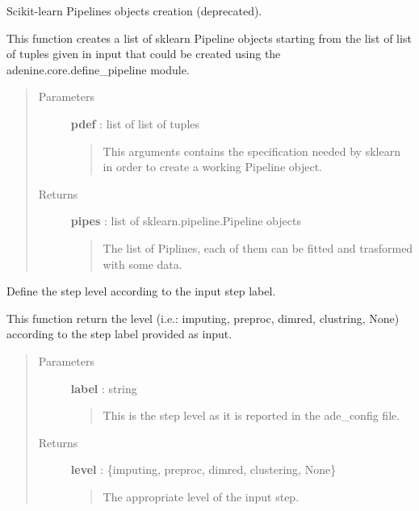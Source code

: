 \documentclass[letterpaper,10pt,english]{sphinxmanual}
\begin{document}
\begin{fulllineitems}
\label{index:adenine.core.pipelines.create}
Scikit-learn Pipelines objects creation (deprecated).

This function creates a list of sklearn Pipeline objects starting from the list of list of tuples given in input that could be created using the adenine.core.define\_pipeline module.
\begin{quote}\begin{description}
\item[{Parameters}] \leavevmode
\textbf{pdef} : list of list of tuples
\begin{quote}

This arguments contains the specification needed by sklearn in order to create a working Pipeline object.
\end{quote}

\item[{Returns}] \leavevmode
\textbf{pipes} : list of sklearn.pipeline.Pipeline objects
\begin{quote}

The list of Piplines, each of them can be fitted and trasformed with some data.
\end{quote}

\end{description}\end{quote}

\end{fulllineitems}


\begin{fulllineitems}
\label{index:adenine.core.pipelines.which_level}
Define the step level according to the input step label.

This function return the level (i.e.: imputing, preproc, dimred, clustring, None) according to the step label provided as input.
\begin{quote}\begin{description}
\item[{Parameters}] \leavevmode
\textbf{label} : string
\begin{quote}

This is the step level as it is reported in the ade\_config file.
\end{quote}

\item[{Returns}] \leavevmode
\textbf{level} : \{imputing, preproc, dimred, clustering, None\}
\begin{quote}

The appropriate level of the input step.
\end{quote}

\end{description}\end{quote}

\end{fulllineitems}
\end{document}
